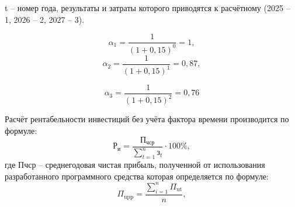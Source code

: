 t – номер года, результаты и затраты которого приводятся к расчётному (2025 – 1, 2026 – 2, 2027 – 3).

\[
\alpha_1 = \frac{1}{(1+0{,}15)^0} = 1,
\]
\[
\alpha_2 = \frac{1}{(1+0{,}15)^1} = 0{,}87,
\]

\[
\alpha_3 = \frac{1}{(1+0{,}15)^2} = 0{,}76
\]

Расчёт рентабельности инвестиций без учёта фактора времени производится по формуле:
\begin{equation}
	\mathrm{Р_{и}} = \frac{\mathrm{П_{чср}}}{\sum_{t=1}^{n} \text{з}_t} \cdot 100\%,
\end{equation}
где Пчср – среднегодовая чистая прибыль, полученной от использования разработанного программного средства которая определяется по формуле:
\begin{equation}
	\Pi_{\mathrm{upp}} = \frac{\sum_{i=1}^{n} \Pi_{\mathrm{ut}}}{n},
\end{equation}
\newpage
